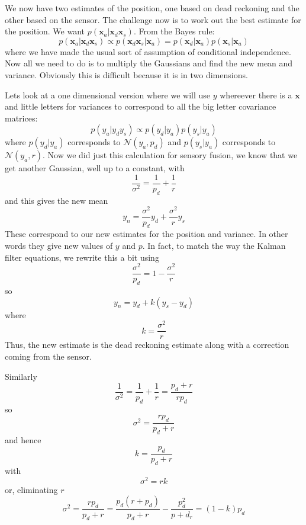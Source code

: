 \documentclass{article}
\begin{document}
We now have two estimates of the position, one based on dead reckoning
and the other based on the sensor. The challenge now is to work out
the best estimate for the position. We want
$p(\mathbf{x}_a|\mathbf{x}_d\mathbf{x}_s)$. From the Bayes rule:
\begin{equation}
p(\mathbf{x}_a|\mathbf{x}_d\mathbf{x}_s)\propto p(\mathbf{x}_d\mathbf{x}_s|\mathbf{x}_a)=p(\mathbf{x}_d|\mathbf{x}_a)p(\mathbf{x}_s|\mathbf{x}_a)
\end{equation}
where we have made the usual sort of assumption of conditional
independence. Now all we need to do is to multiply the Gaussians and
find the new mean and variance. Obviously this is difficult because it
is in two dimensions. 

Lets look at a one dimensional version where we will use $y$ whereever
there is a $\mathbf{x}$ and little letters for variances to correspond
to all the big letter covariance matrices:
\begin{equation}
p(y_a|y_dy_s)\propto p(y_d|y_a)p(y_s|y_a)
\end{equation}
where $p(y_d|y_a)$ corresponds to $\mathcal{N}(y_a,p_d)$ and
$p(y_s|y_a)$ corresponds to $\mathcal{N}(y_a,r)$. Now we did just this calculation for sensory fusion, we know that we get another Gaussian, well up to a constant, with 
\begin{equation}
\frac{1}{\sigma^2}=\frac{1}{p_d}+\frac{1}{r}
\end{equation}
and this gives the new mean
\begin{equation}
y_n=\frac{\sigma^2}{p_d}y_d+\frac{\sigma^2}{r}y_s
\end{equation}
These correspond to our new estimates for the position and
variance. In other words they give new values of $y$ and $p$. In fact, to match the way the Kalman filter equations, we rewrite this a bit using
\begin{equation}
\frac{\sigma^2}{p_d}=1-\frac{\sigma^2}{r}
\end{equation}
so
\begin{equation}
y_n=y_d+k(y_s-y_d)
\end{equation}
where
\begin{equation}
k=\frac{\sigma^2}{r}
\end{equation}
Thus, the new estimate is the dead reckoning estimate along with a correction coming from the sensor. 

Similarly
\begin{equation}
\frac{1}{\sigma^2}=\frac{1}{p_d}+\frac{1}{r}=\frac{p_d+r}{rp_d}
\end{equation}
so 
\begin{equation}
\sigma^2=\frac{rp_d}{p_d+r}
\end{equation}
and hence
\begin{equation}
k=\frac{p_d}{p_d+r}
\end{equation}
with
\begin{equation}
\sigma^2=rk
\end{equation}
or, eliminating $r$
\begin{equation}
\sigma^2=\frac{rp_d}{p_d+r}=\frac{p_d(r+p_d)}{p_d+r}-\frac{p_d^2}{p+d_r}=(1-k)p_d
\end{equation}
\end{document}
